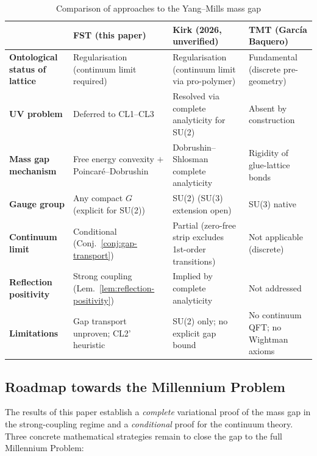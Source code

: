 \documentclass[12pt,a4paper]{article}
\theoremstyle{definition}
\theoremstyle{plain}
\theoremstyle{remark}
\begin{document}
\begin{table}[htbp]
\centering
\small
\caption{Comparison of approaches to the Yang--Mills mass gap}
\label{tab:comparison}
\setlength{\tabcolsep}{4pt}
\begin{tabularx}{\textwidth}{@{}L{2.8cm}Y Y Y@{}}
\toprule
& \textbf{FST (this paper)} & \textbf{Kirk (2026, unverified)} & \textbf{TMT (Garc\'ia Baquero)} \\
\midrule
\textbf{Ontological status of lattice} & Regularisation (continuum limit required) & Regularisation (continuum limit via pro-polymer) & Fundamental (discrete pre-geometry) \\
\midrule
\textbf{UV problem} & Deferred to CL1--CL3 & Resolved via complete analyticity for SU(2) & Absent by construction \\
\midrule
\textbf{Mass gap mechanism} & Free energy convexity $+$ Poincar\'e--Dobrushin & Dobrushin--Shlosman complete analyticity & Rigidity of glue-lattice bonds \\
\midrule
\textbf{Gauge group} & Any compact $G$ (explicit for SU(2)) & SU(2) (SU(3) extension open) & SU(3) native \\
\midrule
\textbf{Continuum limit} & Conditional (Conj.~\ref{conj:gap-transport}) & Partial (zero-free strip excludes 1st-order transitions) & Not applicable (discrete) \\
\midrule
\textbf{Reflection positivity} & Strong coupling (Lem.~\ref{lem:reflection-positivity}) & Implied by complete analyticity & Not addressed \\
\midrule
\textbf{Limitations} & Gap transport unproven; CL2' heuristic & SU(2) only; no explicit gap bound & No continuum QFT; no Wightman axioms \\
\bottomrule
\end{tabularx}
\end{table}

\subsection{Roadmap towards the Millennium Problem}

The results of this paper establish a \emph{complete} variational proof
of the mass gap in the strong-coupling regime and a \emph{conditional}
proof for the continuum theory. Three concrete mathematical strategies
remain to close the gap to the full Millennium Problem:
\end{document}
